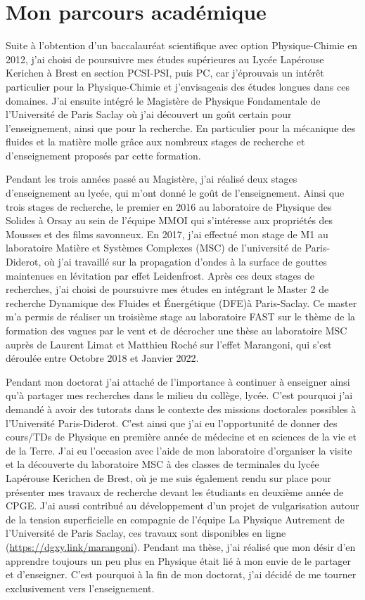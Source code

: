 \documentclass[french, 10pt]{article}
\begin{document}
\section{Mon parcours académique}

Suite à l'obtention d'un baccalauréat scientifique avec option Physique-Chimie en 2012, j'ai choisi de poursuivre mes études supérieures au Lycée Lapérouse Kerichen à Brest en section PCSI-PSI, puis PC, car j'éprouvais un intérêt particulier pour la Physique-Chimie et j'envisageais des études longues dans ces domaines. J'ai ensuite intégré le Magistère de Physique Fondamentale de l'Université de Paris Saclay où j'ai découvert un goût certain pour l'enseignement, ainsi que pour la recherche. En particulier pour la mécanique des fluides et la matière molle grâce aux nombreux stages de recherche et d'enseignement proposés par cette formation.\medskip

Pendant les trois années passé au Magistère, j'ai réalisé deux stages d'enseignement au lycée, qui m'ont donné le goût de l'enseignement. Ainsi que trois stages de recherche, le premier en 2016 au laboratoire de Physique des Solides à Orsay au sein de l'équipe MMOI qui s'intéresse aux propriétés des Mousses et des films savonneux. En 2017, j'ai effectué mon stage de M1 au laboratoire Matière et Systèmes Complexes (MSC) de l'université de Paris-Diderot, où j'ai travaillé sur la propagation d'ondes à la surface de gouttes maintenues en lévitation par effet Leidenfrost. Après ces deux stages de recherches, j'ai choisi de poursuivre mes études en intégrant le Master 2 de recherche Dynamique des Fluides et Énergétique (DFE)à Paris-Saclay. Ce master m'a permis de réaliser un troisième stage au laboratoire FAST sur le thème de la formation des vagues par le vent et de décrocher une thèse au laboratoire MSC auprès de Laurent Limat et Matthieu Roché sur l'effet Marangoni, qui s'est déroulée entre Octobre 2018 et Janvier 2022.\medskip 

Pendant mon doctorat j'ai attaché de l'importance à continuer à enseigner ainsi qu'à partager mes recherches dans le milieu du collège, lycée. C'est pourquoi j'ai demandé à avoir des tutorats dans le contexte des missions doctorales possibles à l'Université Paris-Diderot. C'est ainsi que j'ai eu l'opportunité de donner des cours/TDs de Physique en première année de médecine et en sciences de la vie et de la Terre. J'ai eu l'occasion avec l'aide de mon laboratoire d'organiser la visite et la découverte du laboratoire MSC à des classes de terminales du lycée Lapérouse Kerichen de Brest, où je me suis également rendu sur place pour présenter mes travaux de recherche devant les étudiants en deuxième année de CPGE. J'ai aussi contribué au développement d'un projet de vulgarisation autour de la tension superficielle en compagnie de l'équipe \og{}La Physique Autrement\fg{} de l'Université de Paris Saclay, ces travaux sont disponibles en ligne (\url{https://dgxy.link/marangoni}). Pendant ma thèse, j'ai réalisé que mon désir d'en apprendre toujours un peu plus en Physique était lié à mon envie de le partager et d'enseigner. C'est pourquoi à la fin de mon doctorat, j'ai décidé de me tourner exclusivement vers l'enseignement.\medskip
\end{document}
